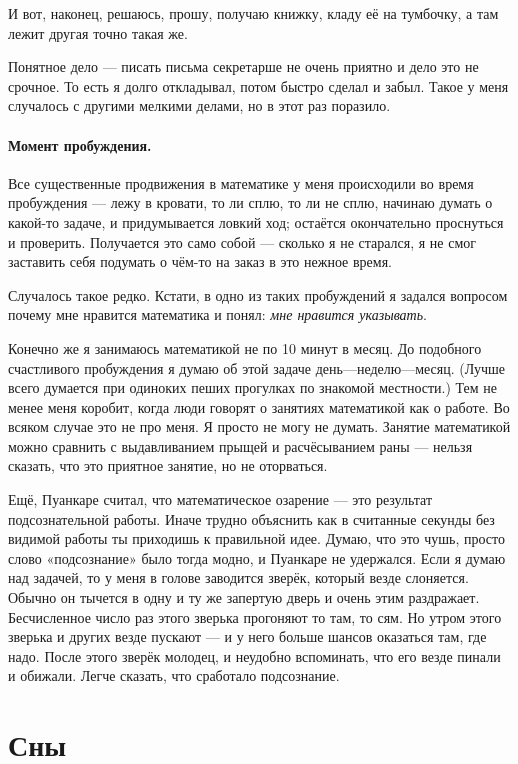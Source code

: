 \documentclass{book}
\begin{document}
И вот, наконец, решаюсь, прошу, получаю книжку, кладу её на тумбочку, а там лежит другая точно такая же.

Понятное дело --- писать письма секретарше не очень приятно и дело это не срочное.
То есть я долго откладывал, потом быстро сделал и забыл.
Такое у меня случалось с другими мелкими делами, но в этот раз поразило.

\paragraph{Момент пробуждения.}
Все существенные продвижения в математике у меня происходили во время пробуждения ---
лежу в кровати, то ли сплю, то ли не сплю, начинаю думать о какой-то задаче, и придумывается ловкий ход; 
остаётся окончательно проснуться и проверить.
Получается это само собой --- сколько я не старался, я не смог заставить себя подумать о чём-то на заказ в это нежное время.

Случалось такое редко.
Кстати, в одно из таких пробуждений я задался вопросом почему мне нравится математика и понял: \textit{мне нравится указывать}.

Конечно же я занимаюсь математикой не по 10 минут в месяц.
До подобного счастливого пробуждения я думаю об этой задаче день---неделю---месяц.
(Лучше всего думается при одиноких пеших прогулках по знакомой местности.)
Тем не менее меня коробит, когда люди говорят о занятиях математикой как о работе.
Во всяком случае это не про меня.
Я просто не могу не думать.
Занятие математикой можно сравнить с выдавливанием прыщей и расчёсыванием раны --- нельзя сказать, что это приятное занятие, но не оторваться.

Ещё, Пуанкаре считал, что математическое озарение --- это результат подсознательной работы.
Иначе трудно объяснить как в считанные секунды без видимой работы ты приходишь к правильной идее.
Думаю, что это чушь, просто слово «подсознание» было тогда модно, и Пуанкаре не удержался.
Если я думаю над задачей, то у меня в голове заводится зверёк, который везде слоняется.
Обычно он тычется в одну и ту же запертую дверь и очень этим раздражает.
Бесчисленное число раз этого зверька прогоняют то там, то сям.
Но утром этого зверька и других везде пускают --- и у него больше шансов оказаться там, где надо.
После этого зверёк молодец, и неудобно вспоминать, что его везде пинали и обижали.
Легче сказать, что сработало подсознание.

\section*{Сны}
\end{document}
